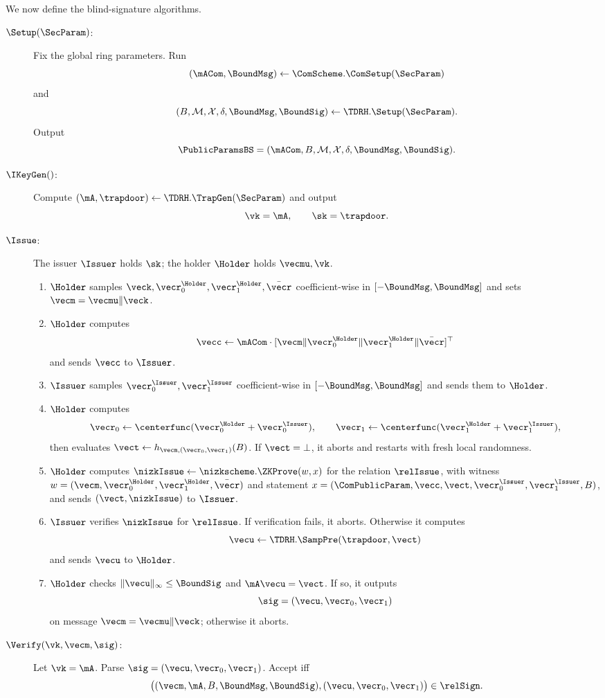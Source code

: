 We now define the blind-signature algorithms.
\begin{description}
  \item[$\Setup(\SecParam)$:] Fix the global ring parameters. Run
  \[
    (\mACom,\BoundMsg)\gets \ComScheme.\ComSetup(\SecParam)
  \]
  and
  \[
    (B,\mathcal{M},\mathcal{X},\delta,\BoundMsg,\BoundSig)\gets \TDRH.\Setup(\SecParam).
  \]
  Output
  \[
    \PublicParamsBS=(\mACom,B,\mathcal{M},\mathcal{X},\delta,\BoundMsg,\BoundSig).
  \]

  \item[$\IKeyGen()$:] Compute \((\mA,\trapdoor)\gets \TDRH.\TrapGen(\SecParam)\) and output
  \[
    \vk=\mA,\qquad \sk=\trapdoor.
  \]

  \item[$\Issue$:] The issuer \(\Issuer\) holds \(\sk\); the holder \(\Holder\) holds \(\vecmu,\vk\).
  \begin{enumerate}[leftmargin=1.25em]
    \item \(\Holder\) samples \(\veck,\vecr_0^{\Holder},\vecr_1^{\Holder},\bar\vecr\) coefficient-wise in
    \([-\BoundMsg,\BoundMsg]\) and sets \(\vecm=\vecmu\Vert \veck\).
    \item \(\Holder\) computes
    \[
      \vecc\gets \mACom\cdot[\vecm\Vert \vecr_0^{\Holder}\Vert \vecr_1^{\Holder}\Vert \bar\vecr]^\top
    \]
    and sends \(\vecc\) to \(\Issuer\).
    \item \(\Issuer\) samples \(\vecr_0^{\Issuer},\vecr_1^{\Issuer}\) coefficient-wise in
    \([-\BoundMsg,\BoundMsg]\) and sends them to \(\Holder\).
    \item \(\Holder\) computes
    \[
      \vecr_0\gets \centerfunc(\vecr_0^{\Holder}+\vecr_0^{\Issuer}),\qquad
      \vecr_1\gets \centerfunc(\vecr_1^{\Holder}+\vecr_1^{\Issuer}),
    \]
    then evaluates \(\vect\gets h_{\vecm,(\vecr_0,\vecr_1)}(B)\). If \(\vect=\bot\), it aborts and restarts with fresh
    local randomness.
    \item \(\Holder\) computes \(\nizkIssue\gets \nizkscheme.\ZKProve(w,x)\) for the relation \(\relIssue\), with
    witness \(w=(\vecm,\vecr_0^{\Holder},\vecr_1^{\Holder},\bar\vecr)\) and statement
    \(x=(\ComPublicParam,\vecc,\vect,\vecr_0^{\Issuer},\vecr_1^{\Issuer},B)\), and sends \((\vect,\nizkIssue)\) to
    \(\Issuer\).
    \item \(\Issuer\) verifies \(\nizkIssue\) for \(\relIssue\). If verification fails, it aborts. Otherwise it computes
    \[
      \vecu\gets \TDRH.\SampPre(\trapdoor,\vect)
    \]
    and sends \(\vecu\) to \(\Holder\).
    \item \(\Holder\) checks \(\|\vecu\|_\infty\le \BoundSig\) and \(\mA\vecu=\vect\). If so, it outputs
    \[
      \sig=(\vecu,\vecr_0,\vecr_1)
    \]
    on message \(\vecm=\vecmu\Vert \veck\); otherwise it aborts.
  \end{enumerate}

  \item[$\Verify(\vk,\vecm,\sig)$:] Let \(\vk=\mA\). Parse \(\sig=(\vecu,\vecr_0,\vecr_1)\). Accept iff
  \[
    \bigl((\vecm,\mA,B,\BoundMsg,\BoundSig),(\vecu,\vecr_0,\vecr_1)\bigr)\in \relSign.
  \]
\end{description}

